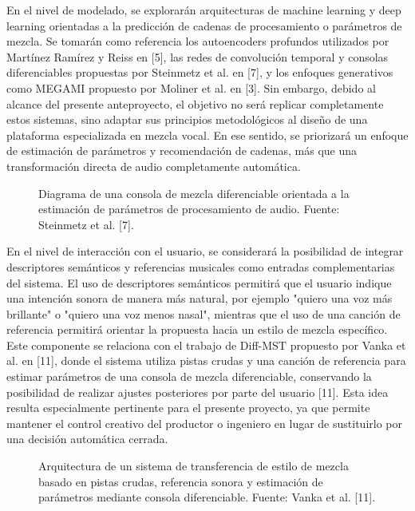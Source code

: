 \documentclass[12pt]{article}
\begin{document}
En el nivel de modelado, se explorarán arquitecturas de machine learning y deep learning orientadas a la predicción de cadenas de procesamiento o parámetros de mezcla. Se tomarán como referencia los autoencoders profundos utilizados por Martínez Ramírez y Reiss en [5], las redes de convolución temporal y consolas diferenciables propuestas por Steinmetz et al. en [7], y los enfoques generativos como MEGAMI propuesto por Moliner et al. en [3]. Sin embargo, debido al alcance del presente anteproyecto, el objetivo no será replicar completamente estos sistemas, sino adaptar sus principios metodológicos al diseño de una plataforma especializada en mezcla vocal. En ese sentido, se priorizará un enfoque de estimación de parámetros y recomendación de cadenas, más que una transformación directa de audio completamente automática.

\begin{figure}[h!]
\centering
\caption{Diagrama de una consola de mezcla diferenciable orientada a la estimación de parámetros de procesamiento de audio. Fuente: Steinmetz et al. [7].}
\label{fig:fig10}
\end{figure}

En el nivel de interacción con el usuario, se considerará la posibilidad de integrar descriptores semánticos y referencias musicales como entradas complementarias del sistema. El uso de descriptores semánticos permitirá que el usuario indique una intención sonora de manera más natural, por ejemplo "quiero una voz más brillante" o "quiero una voz menos nasal", mientras que el uso de una canción de referencia permitirá orientar la propuesta hacia un estilo de mezcla específico. Este componente se relaciona con el trabajo de Diff-MST propuesto por Vanka et al. en [11], donde el sistema utiliza pistas crudas y una canción de referencia para estimar parámetros de una consola de mezcla diferenciable, conservando la posibilidad de realizar ajustes posteriores por parte del usuario [11]. Esta idea resulta especialmente pertinente para el presente proyecto, ya que permite mantener el control creativo del productor o ingeniero en lugar de sustituirlo por una decisión automática cerrada.

\begin{figure}[h!]
\centering
\caption{Arquitectura de un sistema de transferencia de estilo de mezcla basado en pistas crudas, referencia sonora y estimación de parámetros mediante consola diferenciable. Fuente: Vanka et al. [11].}
\label{fig:fig11}
\end{figure}
\end{document}
